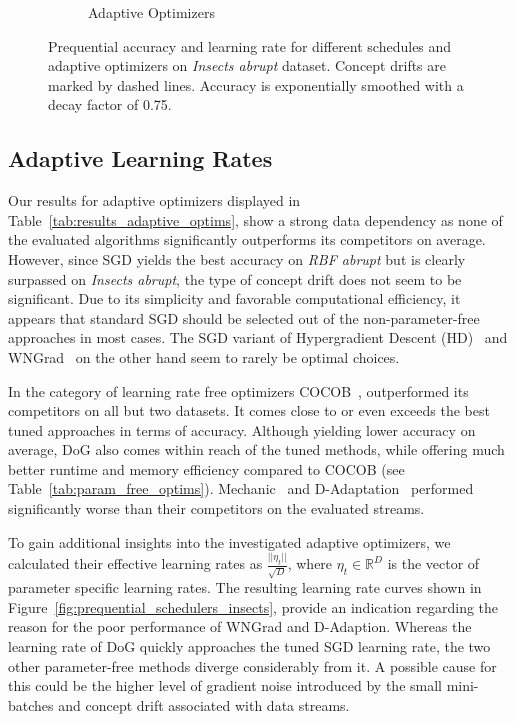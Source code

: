 \documentclass[runningheads]{llncs}
\begin{document}
\begin{figure}[ht]
\begin{subfigure}[b]{0.47\textwidth}
		\caption{Adaptive Optimizers}
		\label{fig:prequential_optims_insects}
	\end{subfigure}
	\caption{Prequential accuracy and learning rate for different schedules and adaptive optimizers on \textit{Insects abrupt} dataset. Concept drifts are marked by dashed lines. Accuracy is exponentially smoothed with a decay factor of 0.75.}
\end{figure}

\subsection{Adaptive Learning Rates}


Our results for adaptive optimizers displayed in Table~\ref{tab:results_adaptive_optims}, show a strong data dependency as none of the evaluated algorithms significantly outperforms its competitors on average.
However, since SGD yields the best accuracy on \textit{RBF abrupt} but is clearly surpassed on \textit{Insects abrupt}, the type of concept drift does not seem to be significant.
Due to its simplicity and favorable computational efficiency, it appears that standard SGD should be selected out of the non-parameter-free approaches in most cases.
The SGD variant of Hypergradient Descent (HD)~\cite{baydinOnlineLearningRate2018} and WNGrad~\cite{wuWNGradLearnLearning2020} on the other hand seem to rarely be optimal choices.

In the category of learning rate free optimizers COCOB~\cite{orabonaTrainingDeepNetworks2017}, outperformed its competitors on all but two datasets.
It comes close to or even exceeds the best tuned approaches in terms of accuracy.
Although yielding lower accuracy on average, DoG also comes within reach of the tuned methods, while offering much better runtime and memory efficiency compared to COCOB (see Table~\ref{tab:param_free_optims}).
Mechanic~\cite{cutkoskyMechanicLearningRate2023} and D-Adaptation~\cite{defazioLearningRateFreeLearningDAdaptation2023a} performed significantly worse than their competitors on the evaluated streams.

To gain additional insights into the investigated adaptive optimizers, we calculated their effective learning rates as $\frac{||\eta_t||}{\sqrt{D}}$, where $\eta_t \in \mathbb{R}^D$ is the vector of parameter specific learning rates.
The resulting learning rate curves shown in Figure~\ref{fig:prequential_schedulers_insects}, provide an indication regarding the reason for the poor performance of WNGrad and D-Adaption.
Whereas the learning rate of DoG quickly approaches the tuned SGD learning rate, the two other parameter-free methods diverge considerably from it.
A possible cause for this could be the higher level of gradient noise introduced by the small mini-batches and concept drift associated with data streams.
\end{document}
